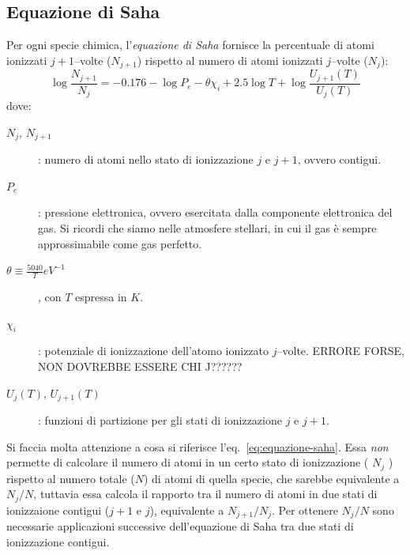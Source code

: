\subsection{Equazione di Saha}
Per ogni specie chimica, l'\emph{equazione di Saha} fornisce la percentuale di atomi ionizzati $j+1$--volte ($N_{j+1}$) rispetto al numero di atomi ionizzati $j$--volte ($N_j$):
\begin{equation}\label{eq:equazione-saha}
    \log \dfrac{N_{j+1}}{N_j} = -0.176 - \log P_e - \theta \chi_i + 2.5 \log T + \log \dfrac{{U_{j+1}}(T)}{{U_j}(T)}
\end{equation}
dove:
\begin{description}
    \item[$N_j$, $N_{j+1}$]: numero di atomi nello stato di ionizzazione $j$ e $j+1$, ovvero contigui.
    \item[$P_e$]: pressione elettronica, ovvero esercitata dalla componente elettronica del gas. Si ricordi che siamo nelle atmosfere stellari, in cui il gas è sempre approssimabile come gas perfetto.
    \item[$\theta \equiv \frac{5040}{T} \si{eV^{-1}}$], con $T$ espressa in $\si{K}$.
    \item[$\chi_i$]: potenziale di ionizzazione dell'atomo ionizzato $j$--volte. ERRORE FORSE, NON DOVREBBE ESSERE CHI J??????
    \item[${U_j}(T)$, ${U_{j+1}}(T)$]: funzioni di partizione per gli stati di ionizzazione $j$ e $j+1$.
\end{description}
Si faccia molta attenzione a cosa si riferisce l'eq.~\eqref{eq:equazione-saha}. Essa \emph{non} permette di calcolare il numero di atomi in un certo stato di ionizzazione ( $N_j$ ) rispetto al numero totale ($N$) di atomi di quella specie, che sarebbe equivalente a $N_j / N$, tuttavia essa calcola il rapporto tra il numero di atomi in due stati di ionizzaione contigui ($j+1$ e $j$), equivalente a $N_{j+1} / N_j$. Per ottenere $N_j / N$ sono necessarie applicazioni successive dell'equazione di Saha tra due stati di ionizzazione contigui.

